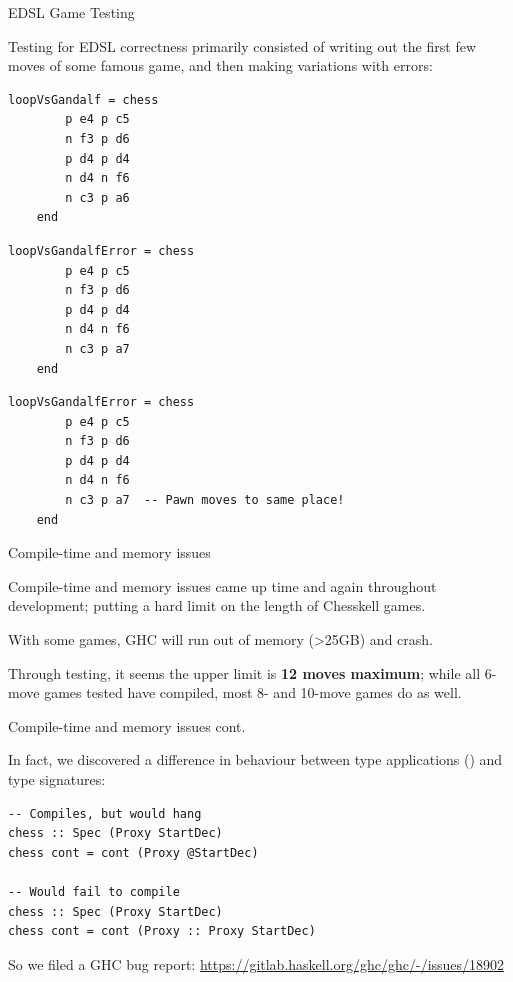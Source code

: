 \documentclass{beamer}
\begin{document}
\begin{frame}[fragile]{EDSL Game Testing}
    
Testing for EDSL correctness primarily consisted of writing out the first few moves of some famous game, and then making variations with errors:

\begin{overprint}

\begin{lstlisting}
loopVsGandalf = chess
        p e4 p c5
        n f3 p d6
        p d4 p d4
        n d4 n f6
        n c3 p a6
    end
\end{lstlisting}

\begin{lstlisting}
loopVsGandalfError = chess
        p e4 p c5
        n f3 p d6
        p d4 p d4
        n d4 n f6
        n c3 p a7
    end
\end{lstlisting}

\begin{lstlisting}
loopVsGandalfError = chess
        p e4 p c5
        n f3 p d6
        p d4 p d4
        n d4 n f6
        n c3 p a7  -- Pawn moves to same place!
    end
\end{lstlisting}

\end{overprint}

\end{frame}

\begin{frame}{Compile-time and memory issues}

Compile-time and memory issues came up time and again throughout development; putting a hard limit on the length of Chesskell games.

With some games, GHC will run out of memory (\textgreater 25GB) and crash.

Through testing, it seems the upper limit is \textbf{12 moves maximum}; while all 6-move games tested have compiled, most 8- and 10-move games do as well.
    
\end{frame}

\begin{frame}[fragile]{Compile-time and memory issues cont.}

In fact, we discovered a difference in behaviour between type applications (\cite{typeapplication}) and type signatures:

\begin{lstlisting}
-- Compiles, but would hang
chess :: Spec (Proxy StartDec)
chess cont = cont (Proxy @StartDec)

-- Would fail to compile
chess :: Spec (Proxy StartDec)
chess cont = cont (Proxy :: Proxy StartDec)
\end{lstlisting}

\pause

So we filed a GHC bug report: \url{https://gitlab.haskell.org/ghc/ghc/-/issues/18902}
    
\end{frame}
\end{document}

